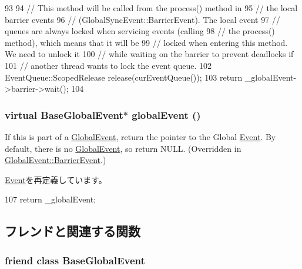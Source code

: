 \begin{DoxyCode}
93         {
94             // This method will be called from the process() method in
95             // the local barrier events
96             // (GlobalSyncEvent::BarrierEvent).  The local event
97             // queues are always locked when servicing events (calling
98             // the process() method), which means that it will be
99             // locked when entering this method. We need to unlock it
100             // while waiting on the barrier to prevent deadlocks if
101             // another thread wants to lock the event queue.
102             EventQueue::ScopedRelease release(curEventQueue());
103             return _globalEvent->barrier->wait();
104         }
\end{DoxyCode}
\hypertarget{classBaseGlobalEvent_1_1BarrierEvent_a22afab66586c2982ac7548fba9e6835b}{
\subsubsection[{globalEvent}]{\setlength{\rightskip}{0pt plus 5cm}virtual {\bf BaseGlobalEvent}$\ast$ globalEvent ()}}
\label{classBaseGlobalEvent_1_1BarrierEvent_a22afab66586c2982ac7548fba9e6835b}
If this is part of a \hyperlink{classGlobalEvent}{GlobalEvent}, return the pointer to the Global \hyperlink{classEvent}{Event}. By default, there is no \hyperlink{classGlobalEvent}{GlobalEvent}, so return NULL. (Overridden in \hyperlink{classGlobalEvent_1_1BarrierEvent}{GlobalEvent::BarrierEvent}.) 

\hyperlink{classEvent_a22afab66586c2982ac7548fba9e6835b}{Event}を再定義しています。


\begin{DoxyCode}
107 { return _globalEvent; }
\end{DoxyCode}


\subsection{フレンドと関連する関数}
\hypertarget{classBaseGlobalEvent_1_1BarrierEvent_abb0ec5ec7e3cd370f8ee27b8cdd5a8d3}{
\subsubsection[{BaseGlobalEvent}]{\setlength{\rightskip}{0pt plus 5cm}friend class {\bf BaseGlobalEvent}}}
\label{classBaseGlobalEvent_1_1BarrierEvent_abb0ec5ec7e3cd370f8ee27b8cdd5a8d3}


